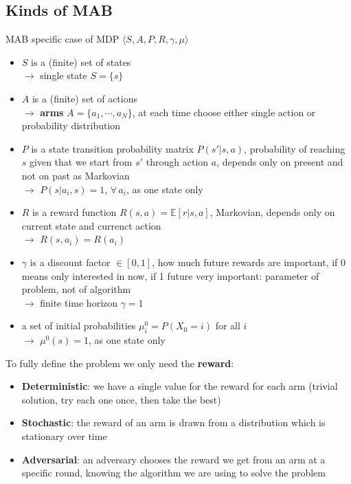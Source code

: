 \subsection{Kinds of MAB}
    MAB specific case of MDP $\langle S,A,P,R,\gamma,\mu\rangle$
    \begin{itemize}
        \item $S$ is a (finite) set of states \\$\rightarrow$ single state $S=\{s\}$
        \item $A$ is a (finite) set of actions \\$\rightarrow$ \textbf{arms} $A=\{a_1,\cdots,a_N\}$, at each time choose either single action or probability distribution
        \item $P$ is a state transition probability matrix $P(s'|s,a)$, probability of reaching $s$ given that we start from $s'$ through action $a$, depends only on present and not on past as Markovian \\$\rightarrow$ $P(s|a_i,s)=1$, $\forall\,a_i$, as one state only
        \item $R$ is a reward function $R(s,a)=\mathbb{E}[r|s,a]$, Markovian, depends only on current state and currenct action \\$\rightarrow$ $R(s,a_i)=R(a_i)$
        \item $\gamma$ is a discount factor $\in [0,1]$, how much future rewards are important, if 0 means only interested in now, if 1 future very important: parameter of problem, not of algorithm \\$\rightarrow$ finite time horizon $\gamma=1$
        \item a set of initial probabilities $\mu_i^0=P(X_0=i)$ for all $i$ \\$\rightarrow$ $\mu^0(s)=1$, as one state only
    \end{itemize}
    To fully define the problem we only need the \textbf{reward}:
    \begin{itemize}
        \item \textbf{Deterministic}: we have a single value for the reward for each arm (trivial solution, try each one once, then take the best)
        \item \textbf{Stochastic}: the reward of an arm is drawn from a distribution which is stationary over time
        \item \textbf{Adversarial}: an adversary chooses the reward we get from an arm at a specific round, knowing the algorithm we are using to solve the problem
    \end{itemize}
